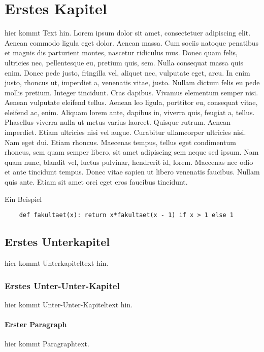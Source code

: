 \documentclass[11pt]{article}
\begin{document}
\tableofcontents
\newpage
\listoffigures
\newpage



\section{Erstes Kapitel}
hier kommt Text hin.
Lorem ipsum dolor sit amet, consectetuer adipiscing elit. Aenean commodo ligula eget dolor. Aenean massa. Cum sociis natoque penatibus et magnis dis parturient montes, nascetur ridiculus mus. Donec quam felis, ultricies nec, pellentesque eu, pretium quis, sem. Nulla consequat massa quis enim. Donec pede justo, fringilla vel, aliquet nec, vulputate eget, arcu. In enim justo, rhoncus ut, imperdiet a, venenatis vitae, justo. Nullam dictum felis eu pede mollis pretium. Integer tincidunt. Cras dapibus. Vivamus elementum semper nisi. Aenean vulputate eleifend tellus. Aenean leo ligula, porttitor eu, consequat vitae, eleifend ac, enim. Aliquam lorem ante, dapibus in, viverra quis, feugiat a, tellus. Phasellus viverra nulla ut metus varius laoreet. Quisque rutrum. Aenean imperdiet. Etiam ultricies nisi vel augue. Curabitur ullamcorper ultricies nisi. Nam eget dui. Etiam rhoncus. Maecenas tempus, tellus eget condimentum rhoncus, sem quam semper libero, sit amet adipiscing sem neque sed ipsum. Nam quam nunc, blandit vel, luctus pulvinar, hendrerit id, lorem. Maecenas nec odio et ante tincidunt tempus. Donec vitae sapien ut libero venenatis faucibus. Nullam quis ante. Etiam sit amet orci eget eros faucibus tincidunt.

\begin{listing}[H]
    \caption{Ein Beispiel}
    \begin{verbatim}
    def fakultaet(x): return x*fakultaet(x - 1) if x > 1 else 1
    \end{verbatim}
\end{listing}

\subsection{Erstes Unterkapitel}
hier kommt Unterkapiteltext hin.

\subsubsection{Erstes Unter-Unter-Kapitel}
hier kommt Unter-Unter-Kapiteltext hin.

\paragraph{Erster Paragraph}
hier kommt Paragraphtext.
\end{document}
